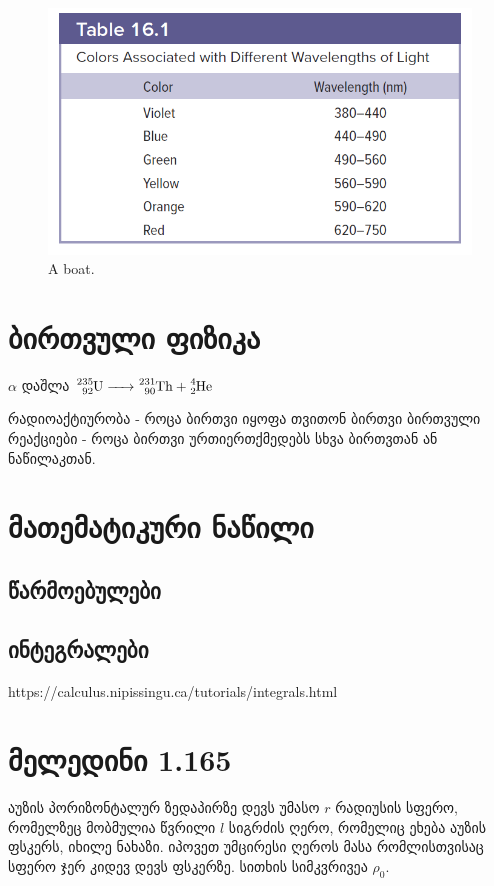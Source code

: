 \documentclass[a4paper]{book}
\begin{document}
	\begin{figure}[H]
    	\includegraphics[width=0.8\columnwidth]{figures/yyyu}
    \caption{A boat.}
    \label{fig:02}
    \end{figure}


\chapter{ბირთვული ფიზიკა}
$\alpha$ დაშლა $\ce{^235_92U -> ^231_90Th + ^4_2He}$

რადიოაქტიურობა - როცა ბირთვი იყოფა თვითონ ბირთვი
ბირთვული რეაქციები - როცა ბირთვი ურთიერთქმედებს სხვა ბირთვთან ან ნაწილაკთან.

\chapter{მათემატიკური ნაწილი}
\section{წარმოებულები}
\section{ინტეგრალები}
https://calculus.nipissingu.ca/tutorials/integrals.html

\chapter{მელედინი 1.165} აუზის პორიზონტალურ ზედაპირზე დევს უმასო $r$ რადიუსის სფერო, რომელზეც მობმულია წვრილი $l$ სიგრძის ღერო, რომელიც ეხება აუზის ფსკერს, იხილე ნახაზი. იპოვეთ უმცირესი ღეროს მასა რომლისთვისაც სფერო ჯერ კიდევ დევს ფსკერზე. სითხის სიმკვრივეა $\rho_0$. 
\end{document}
